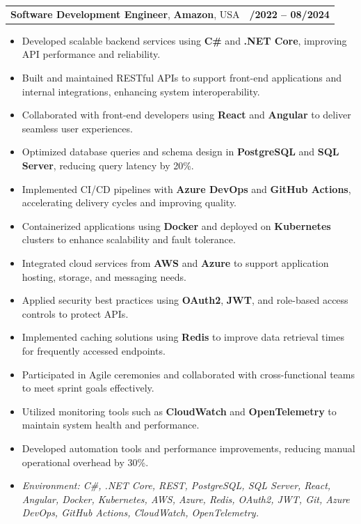 \documentclass[letterpaper,11pt]{article}
\makeatletter
\newcommand{\resumeItem}[1]{
  \item\footnotesize{
    {#1 \vspace{-2pt}}
  }
}
\newcommand{\resumeSubheading}[4]{
  \vspace{-2pt}\item
    \begin{tabular*}{1.0\textwidth}[t]{l@{\extracolsep{\fill}}r}
      \textbf{\fontsize{10pt}{14pt}\selectfont #3}, \textbf{\fontsize{10pt}{14pt}\selectfont #1}, \fontsize{10pt}{14pt}\selectfont #4 & \textbf{\fontsize{10pt}{14pt}\selectfont #2} \\
    \end{tabular*}\vspace{-7pt}
}
\newcommand{\resumeItemListStart}{\begin{itemize}[leftmargin=*]}
\newcommand{\resumeItemListEnd}{\end{itemize}\vspace{-5pt}}
\makeatother
\begin{document}
\resumeSubheading
{Amazon}{10/2022 -- 08/2024}
{Software Development Engineer}{USA}
\resumeItemListStart
  \resumeItem{Developed scalable backend services using \textbf{C\#} and \textbf{.NET Core}, improving API performance and reliability.}
  \resumeItem{Built and maintained RESTful APIs to support front-end applications and internal integrations, enhancing system interoperability.}
  \resumeItem{Collaborated with front-end developers using \textbf{React} and \textbf{Angular} to deliver seamless user experiences.}
  \resumeItem{Optimized database queries and schema design in \textbf{PostgreSQL} and \textbf{SQL Server}, reducing query latency by 20\%.}
  \resumeItem{Implemented CI/CD pipelines with \textbf{Azure DevOps} and \textbf{GitHub Actions}, accelerating delivery cycles and improving quality.}
  \resumeItem{Containerized applications using \textbf{Docker} and deployed on \textbf{Kubernetes} clusters to enhance scalability and fault tolerance.}
  \resumeItem{Integrated cloud services from \textbf{AWS} and \textbf{Azure} to support application hosting, storage, and messaging needs.}
  \resumeItem{Applied security best practices using \textbf{OAuth2}, \textbf{JWT}, and role-based access controls to protect APIs.}
  \resumeItem{Implemented caching solutions using \textbf{Redis} to improve data retrieval times for frequently accessed endpoints.}
  \resumeItem{Participated in Agile ceremonies and collaborated with cross-functional teams to meet sprint goals effectively.}
  \resumeItem{Utilized monitoring tools such as \textbf{CloudWatch} and \textbf{OpenTelemetry} to maintain system health and performance.}
  \resumeItem{Developed automation tools and performance improvements, reducing manual operational overhead by 30\%.}
  \resumeItem{\textit{Environment: C\#, .NET Core, REST, PostgreSQL, SQL Server, React, Angular, Docker, Kubernetes, AWS, Azure, Redis, OAuth2, JWT, Git, Azure DevOps, GitHub Actions, CloudWatch, OpenTelemetry.}}
\resumeItemListEnd
\end{document}
